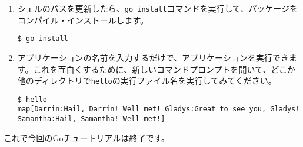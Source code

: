 \begin{enumerate}
そうすれば、実行ファイルがある場所を指定せずに、プログラムの実行ファイルを実行できるようになります。

\begin{itemize}
\item LinuxまたはMacの場合、以下のコマンドを実行します。
\begin{lstlisting}[numbers=none]
$ export PATH=$PATH:/path/to/your/install/directory
\end{lstlisting}

\item Windowsの場合、以下のコマンドを実行します。
\begin{lstlisting}[numbers=none]
$ set PATH=%PATH%;C:\path\to\your\install\directory
\end{lstlisting}
\end{itemize}

別の方法として、シェルのパスに既に\texttt{\$HOME/bin}のようなディレクトリがあり、そこにGoプログラムをインストールしたい場合、\texttt{go env}コマンドで\texttt{GOBIN}変数を設定することにより、インストール先を変更することができます。

\begin{lstlisting}[numbers=none]
$ go env -w GOBIN=/path/to/your/bin
\end{lstlisting}

または、

\begin{lstlisting}[numbers=none]
$ go env -w GOBIN=C:\path\to\your\bin
\end{lstlisting}

\item シェルのパスを更新したら、\texttt{go install}コマンドを実行して、パッケージをコンパイル・インストールします。
\begin{lstlisting}[numbers=none]
$ go install
\end{lstlisting}

\item アプリケーションの名前を入力するだけで、アプリケーションを実行できます。これを面白くするために、新しいコマンドプロンプトを開いて、どこか他のディレクトリで\texttt{hello}の実行ファイル名を実行してみてください。

\begin{lstlisting}[numbers=none]
$ hello
map[Darrin:Hail, Darrin! Well met! Gladys:Great to see you, Gladys! Samantha:Hail, Samantha! Well met!]
\end{lstlisting}
\end{enumerate}


これで今回のGoチュートリアルは終了です。





